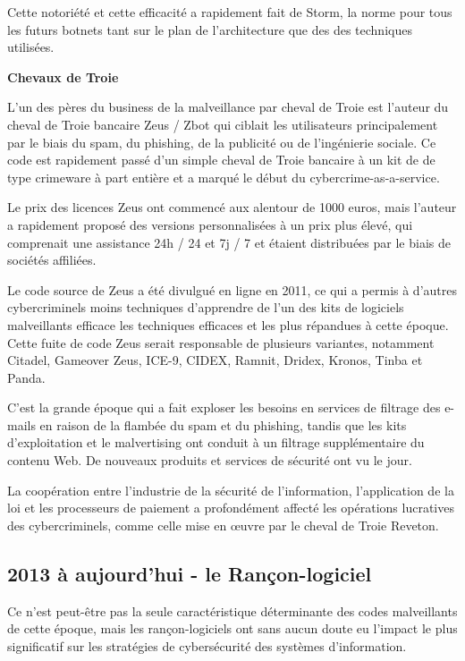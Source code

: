 Cette notoriété et cette efficacité a rapidement fait de Storm, la norme pour tous les futurs botnets tant sur le plan de l'architecture que des des techniques utilisées.

\textbf{Chevaux de Troie}

L'un des pères du business de la malveillance par  cheval de Troie est l'auteur du cheval de Troie bancaire Zeus / Zbot qui ciblait les utilisateurs principalement par le biais du spam, du phishing, de la publicité ou de l'ingénierie sociale. Ce code est rapidement passé d'un simple cheval de Troie bancaire à un kit de de type crimeware à part entière et a marqué le début du cybercrime-as-a-service.

Le prix des licences Zeus ont commencé aux alentour de 1000 euros, mais l'auteur a rapidement proposé des versions personnalisées à un prix plus élevé, qui comprenait une assistance 24h / 24 et 7j / 7 et étaient distribuées par le biais de sociétés affiliées.

Le code source de Zeus a été divulgué en ligne en 2011, ce qui a permis à d'autres  cybercriminels moins techniques d'apprendre de l'un des kits de logiciels malveillants efficace les techniques efficaces et les plus répandues à cette époque. Cette fuite de code Zeus serait responsable de plusieurs variantes, notamment Citadel, Gameover Zeus, ICE-9, CIDEX, Ramnit, Dridex, Kronos, Tinba et Panda.

C'est la grande époque qui a fait exploser les besoins en services de filtrage des e-mails en raison de la flambée du spam et du phishing, tandis que les kits d'exploitation et le malvertising ont conduit à un filtrage supplémentaire du contenu Web.  De nouveaux produits et services de sécurité ont vu le jour. 

La coopération entre l’industrie de la sécurité de l’information, l’application de la loi et les processeurs de paiement a profondément affecté les opérations lucratives des cybercriminels, comme celle mise en œuvre par le cheval de Troie Reveton.



\subsection{2013 à aujourd'hui - le Rançon-logiciel}

Ce n'est peut-être pas la seule caractéristique déterminante des codes malveillants de cette époque, mais les rançon-logiciels ont sans aucun doute eu l'impact le plus significatif sur les stratégies de cybersécurité des systèmes d'information.


